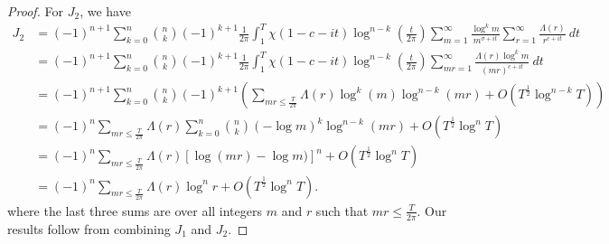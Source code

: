 \documentclass[10pt,a4paper]{amsart}
\begin{document}
\begin{proof}
For $J_2$, we have
\begin{align*}
J_2 &= (-1)^{n+1} \sum_{k=0}^n \binom{n}{k} (-1)^{k+1} \frac{1}{2 \pi } \int_{1}^{T} \chi (1 - c - it)  \log^{n-k} \left( \frac{t}{2 \pi} \right) \sum_{m=1}^{\infty} \frac{ \log^k m}{m^{\sigma + it}} \sum_{r=1}^{\infty} \frac{\Lambda (r)}{r^{c+it}} \ dt \\
&= (-1)^{n+1} \sum_{k=0}^n \binom{n}{k} (-1)^{k+1} \frac{1}{2 \pi } \int_{1}^{T} \chi (1 - c - it)  \log^{n-k} \left( \frac{t}{2 \pi} \right) \sum_{mr=1}^{\infty} \frac{ \Lambda (r) \log^k m }{(mr)^{c + it}} \ dt \\
&= (-1)^{n+1} \sum_{k=0}^n \binom{n}{k} (-1)^{k+1} \left( \sum_{m r \leq \frac{T}{2 \pi}} \Lambda (r) \log^k (m) \log^{n-k} (m r) + O(T^{\frac{1}{2}}\log^{n-k} T)\right)\\
&= (-1)^{n} \sum_{m r \leq \frac{T}{2 \pi}} \Lambda (r) \sum_{k=0}^n \binom{n}{k} (-\log m)^k \log^{n-k} (m r)  + O(T^{\frac{1}{2}}\log^{n} T) \\
&= (-1)^{n} \sum_{m r \leq \frac{T}{2 \pi}} \Lambda (r) [\log (m r) -\log m)]^n + O(T^{\frac{1}{2}}\log^{n} T)\\
&= (-1)^{n} \sum_{m r \leq \frac{T}{2 \pi}} \Lambda (r) \log ^n r + O(T^{\frac{1}{2}}\log^{n} T).
\end{align*}
where the last three sums are over all integers $m$ and $r$ such that $mr \leq \frac{T}{2\pi}$. Our results follow from combining $J_1$ and $J_2$.
\end{proof}
\end{document}
